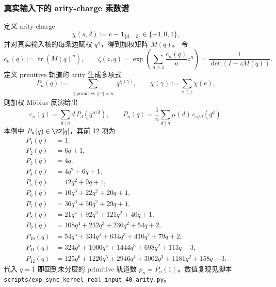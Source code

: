 \subsubsection{真实输入下的 arity-charge 素数谱}
定义 arity-charge
\[
\chi(s,d):=e-\mathbf{1}_{\{d=2\}}\in\{-1,0,1\},
\]
并对真实输入核的每条边赋权 $q^{\chi}$，得到加权矩阵 $M(q)$。
令
\[
c_n(q):=\operatorname{tr}(M(q)^n),
\qquad
\zeta(z,q)=\exp\!\left(\sum_{n\ge 1}\frac{c_n(q)}{n}z^n\right)
=\frac{1}{\det(I-zM(q))}.
\]
定义 primitive 轨道的 arity 生成多项式
\[
P_n(q):=\sum_{\substack{\gamma\ \mathrm{primitive}\|\gamma|=n}} q^{\chi(\gamma)},
\qquad
\chi(\gamma):=\sum_{e\in\gamma}\chi(e),
\]
则加权 Möbius 反演给出
\[
c_n(q)=\sum_{d\mid n} d\,P_d\!\left(q^{n/d}\right),
\qquad
P_n(q)=\frac{1}{n}\sum_{d\mid n}\mu(d)\,c_{n/d}\!\left(q^{d}\right).
\]
本例中 $P_n(q)\in\ZZ[q]$，其前 12 项为
\[
\begin{aligned}
P_1(q)&=1,\\
P_2(q)&=6q+1,\\
P_3(q)&=4q,\\
P_4(q)&=4q^2+6q+1,\\
P_5(q)&=12q^2+9q+1,\\
P_6(q)&=10q^3+22q^2+20q+1,\\
P_7(q)&=36q^3+50q^2+29q+1,\\
P_8(q)&=21q^4+92q^3+121q^2+40q+1,\\
P_9(q)&=108q^4+232q^3+236q^2+54q+2,\\
P_{10}(q)&=54q^5+334q^4+634q^3+410q^2+79q+2,\\
P_{11}(q)&=324q^5+1000q^4+1444q^3+698q^2+113q+3,\\
P_{12}(q)&=125q^6+1220q^5+2946q^4+3002q^3+1181q^2+158q+3.
\end{aligned}
\]
代入 $q=1$ 即回到未分层的 primitive 轨道数 $p_n=P_n(1)$。数值复现见脚本
\texttt{scripts/exp\_sync\_kernel\_real\_input\_40\_arity.py}。

